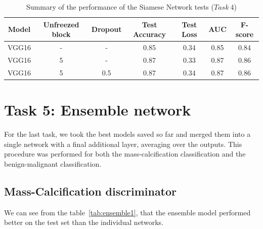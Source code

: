 \documentclass[11pt,a4paper,oneside]{article}
\begin{document}
\begin{table}[h]
\centering
	\begin{tabular}{|ccc|cccc|}
	\hline
	Model & Unfreezed block & Dropout & Test Accuracy & Test Loss & AUC & F-score \\
	\hline
	VGG16 & - & -   & 0.85 & 0.34 & 0.85 & 0.84 \\
	VGG16 & 5 & -   & 0.87 & 0.33 & 0.87 & 0.86 \\
	VGG16 & 5 & 0.5 & 0.87 & 0.34 & 0.87 & 0.86 \\
	\hline
	\end{tabular}
\caption{Summary of the performance of the Siamese Network tests ($Task\ 4$)}
\end{table}

\clearpage

\section{Task 5: Ensemble network}
For the last task, we took the best models saved so far and merged them into a single network with a final additional layer, averaging over the outputs. This procedure was performed for both the mass-calcification classification and the benign-malignant classification.

\subsection{Mass-Calcification discriminator}
We can see from the table~\ref{tab:ensemble1}, that the ensemble model performed better on the test set than the individual networks.
\end{document}
